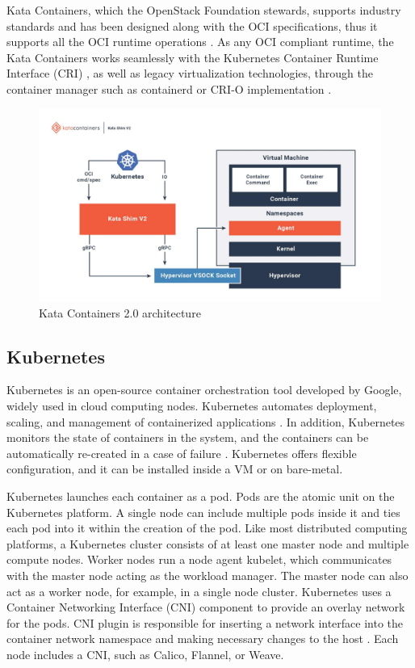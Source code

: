 Kata Containers, which the OpenStack Foundation stewards, supports industry standards and has been designed along with the OCI \cite{OCI} specifications, thus it supports all the OCI runtime operations \cite{Kumar2020}. As any OCI compliant runtime, the Kata Containers works seamlessly with the Kubernetes Container Runtime Interface (CRI) \cite{CRI}, as well as legacy virtualization technologies, through the container manager such as containerd or CRI-O implementation \cite{Randazzo2019}.

\begin{figure}[ht]
  \begin{center}
    \includegraphics[width=13.5cm]{images/KataContainersArchitecture.jpg}
    \caption{Kata Containers 2.0 architecture \cite{KataContainers}}
    \label{fig:KataContainersArchitecture}
  \end{center}
\end{figure}

\subsection{Kubernetes}

Kubernetes is an open-source container orchestration tool developed by Google, widely used in cloud computing nodes. Kubernetes automates deployment, scaling, and management of containerized applications \cite{Kubernetes}. In addition, Kubernetes monitors the state of containers in the system, and the containers can be automatically re-created in a case of failure \cite{Toimela2017}. Kubernetes offers flexible configuration, and it can be installed inside a VM or on bare-metal. 

Kubernetes launches each container as a pod. Pods are the atomic unit on the Kubernetes platform. A single node can include multiple pods inside it and ties each pod into it within the creation of the pod. Like most distributed computing platforms, a Kubernetes cluster consists of at least one master node and multiple compute nodes. Worker nodes run a node agent kubelet, which communicates with the master node acting as the workload manager. The master node can also act as a worker node, for example, in a single node cluster. Kubernetes uses a Container Networking Interface (CNI)\cite{CNI} component to provide an overlay network for the pods. CNI plugin is responsible for inserting a network interface into the container network namespace and making necessary changes to the host \cite{RedHatCNI}. Each node includes a CNI, such as Calico, Flannel, or Weave.

